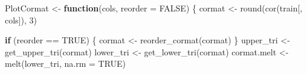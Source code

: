 \documentclass[
]{article}
\newenvironment{Shaded}{\begin{snugshade}}{\end{snugshade}}
\newcommand{\AttributeTok}[1]{\textcolor[rgb]{0.77,0.63,0.00}{#1}}
\newcommand{\ConstantTok}[1]{\textcolor[rgb]{0.00,0.00,0.00}{#1}}
\newcommand{\ControlFlowTok}[1]{\textcolor[rgb]{0.13,0.29,0.53}{\textbf{#1}}}
\newcommand{\DecValTok}[1]{\textcolor[rgb]{0.00,0.00,0.81}{#1}}
\newcommand{\FunctionTok}[1]{\textcolor[rgb]{0.00,0.00,0.00}{#1}}
\newcommand{\NormalTok}[1]{#1}
\newcommand{\OtherTok}[1]{\textcolor[rgb]{0.56,0.35,0.01}{#1}}
\newcommand{\SpecialCharTok}[1]{\textcolor[rgb]{0.00,0.00,0.00}{#1}}
\begin{document}
\begin{Shaded}
\begin{Highlighting}[]
\NormalTok{PlotCormat }\OtherTok{\textless{}{-}} \ControlFlowTok{function}\NormalTok{(cols, }\AttributeTok{reorder =} \ConstantTok{FALSE}\NormalTok{) \{}
\NormalTok{  cormat }\OtherTok{\textless{}{-}} \FunctionTok{round}\NormalTok{(}\FunctionTok{cor}\NormalTok{(train[, cols]), }\DecValTok{3}\NormalTok{)}
  
  \ControlFlowTok{if}\NormalTok{ (reorder }\SpecialCharTok{==} \ConstantTok{TRUE}\NormalTok{) \{}
\NormalTok{    cormat }\OtherTok{\textless{}{-}} \FunctionTok{reorder\_cormat}\NormalTok{(cormat)}
\NormalTok{  \}}
\NormalTok{  upper\_tri }\OtherTok{\textless{}{-}} \FunctionTok{get\_upper\_tri}\NormalTok{(cormat)}
\NormalTok{  lower\_tri }\OtherTok{\textless{}{-}} \FunctionTok{get\_lower\_tri}\NormalTok{(cormat)}
\NormalTok{  cormat.melt }\OtherTok{\textless{}{-}} \FunctionTok{melt}\NormalTok{(lower\_tri, }\AttributeTok{na.rm =} \ConstantTok{TRUE}\NormalTok{)}
  

\end{Highlighting}
\end{Shaded}
\end{document}
